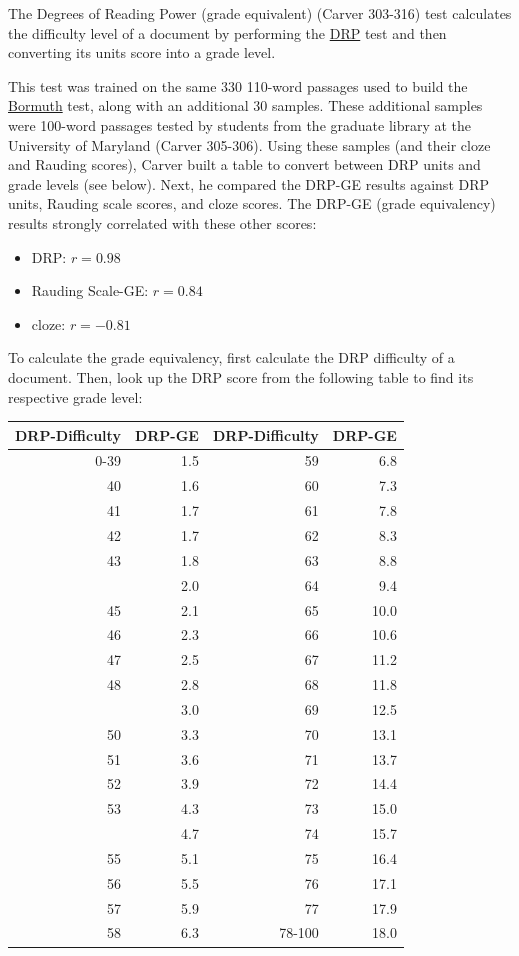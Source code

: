 \documentclass[
]{book}
\providecommand{\tightlist}{%
  \setlength{\itemsep}{0pt}\setlength{\parskip}{0pt}}
\theoremstyle{definition}
\theoremstyle{definition}
\theoremstyle{definition}
\theoremstyle{definition}
\theoremstyle{remark}
\begin{document}
The Degrees of Reading Power (grade equivalent) (Carver 303-316) test calculates the difficulty level of a document by performing the \protect\hyperlink{degrees-of-reading-power}{DRP} test and then converting its units score into a grade level.

This test was trained on the same 330 110-word passages used to build the \protect\hyperlink{bormuth-cloze-mean-machine-passage}{Bormuth} test, along with an additional 30 samples. These additional samples were 100-word passages tested by students from the graduate library at the University of Maryland (Carver 305-306). Using these samples (and their cloze and Rauding scores), Carver built a table to convert between DRP units and grade levels (see below). Next, he compared the DRP-GE results against DRP units, Rauding scale scores, and cloze scores. The DRP-GE (grade equivalency) results strongly correlated with these other scores:

\begin{itemize}
\tightlist
\item
  DRP: \(r = 0.98\)
\item
  Rauding Scale-GE: \(r = 0.84\)
\item
  cloze: \(r = -0.81\)
\end{itemize}

To calculate the grade equivalency, first calculate the DRP difficulty of a document. Then, look up the DRP score from the following table to find its respective grade level:

\begin{table}
\centering
\begin{tabular}[t]{r>{}r|rr}
\toprule
DRP-Difficulty & DRP-GE & DRP-Difficulty  & DRP-GE \\
\midrule
0-39 & 1.5 & 59 & 6.8\\
40 & 1.6 & 60 & 7.3\\
41 & 1.7 & 61 & 7.8\\
42 & 1.7 & 62 & 8.3\\
43 & 1.8 & 63 & 8.8\\
\addlinespace
44 & 2.0 & 64 & 9.4\\
45 & 2.1 & 65 & 10.0\\
46 & 2.3 & 66 & 10.6\\
47 & 2.5 & 67 & 11.2\\
48 & 2.8 & 68 & 11.8\\
\addlinespace
49 & 3.0 & 69 & 12.5\\
50 & 3.3 & 70 & 13.1\\
51 & 3.6 & 71 & 13.7\\
52 & 3.9 & 72 & 14.4\\
53 & 4.3 & 73 & 15.0\\
\addlinespace
54 & 4.7 & 74 & 15.7\\
55 & 5.1 & 75 & 16.4\\
56 & 5.5 & 76 & 17.1\\
57 & 5.9 & 77 & 17.9\\
58 & 6.3 & 78-100 & 18.0\\
\bottomrule
\end{tabular}
\end{table}
\end{document}
